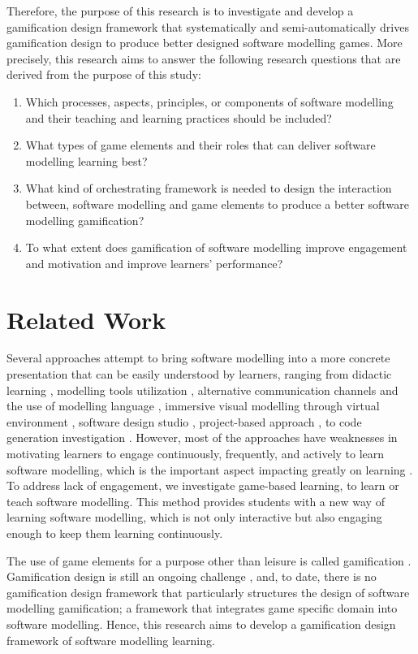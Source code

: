 \documentclass[runningheads,a4paper]{llncs}
\begin{document}
Therefore, the purpose of this research is to investigate and develop a gamification design framework that systematically and semi-automatically drives gamification design to produce better designed software modelling games. More precisely, this research aims to answer the following research questions that are derived from the purpose of this study:
\begin{enumerate}
\item Which processes, aspects, principles, or components of software modelling and their teaching and learning practices should be included?
\item What types of game elements and their roles that can deliver software modelling learning best? 
\item What kind of  orchestrating framework is needed to design the interaction between, software modelling and game elements to produce a better software modelling gamification?
\item To what extent does gamification of software modelling improve engagement and motivation and improve learners’ performance?
\end{enumerate}

\section{Related Work}
Several approaches attempt to bring software modelling into a more concrete presentation that can be easily understood by learners, ranging from didactic learning \cite{moisan2009teaching}, modelling tools utilization \cite{Akayama2013}, alternative communication channels and the use of modelling language \cite{Brandsteidl2011}, immersive visual modelling through virtual environment \cite{neubauer2003immersive}, software design studio \cite{Whittle2014}, project-based approach \cite{Szmurlo2007}, to code generation investigation \cite{schmidt2014teaching}. However, most of the approaches have weaknesses in motivating learners to engage continuously, frequently, and actively to learn software modelling, which is the important aspect impacting greatly on learning \cite{Naps2005}. To address lack of engagement, we investigate game-based learning, to learn or teach software modelling. This method provides students with a new way of learning software modelling, which is not only interactive but also engaging enough to keep them learning continuously. 

The use of game elements for a purpose other than leisure is called gamification \cite{deterding2011game}. Gamification design is still an ongoing challenge \cite{Deterding2013}, and, to date, there is no gamification design framework that particularly structures the design of software modelling gamification; a framework that integrates game specific domain into software modelling. Hence, this research aims to develop a gamification design framework of software modelling learning.
\end{document}
